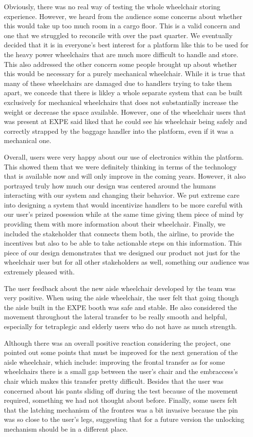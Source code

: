 	Obviously, there was no real way of testing the whole wheelchair storing experience. However, we heard from the audience some concerns about whether this would take up too much room in a cargo floor. This is a valid concern and one that we struggled to reconcile with over the past quarter. We eventually decided that it is in everyone's best interest for a platform like this to be used for the heavy power wheelchairs that are much more difficult to handle and store. This also addressed the other concern some people brought up about whether this would be necessary for a purely mechanical wheelchair. While it is true that many of these wheelchairs are damaged due to handlers trying to take them apart, we concede that there is likley a whole separate system that can be built exclusively for mechanical wheelchairs that does not substantially increase the weight or decrease the space available.  However, one of the wheelchair users that was present at EXPE said liked that he could see his wheelchair being safely and correctly strapped by the baggage handler into the platform, even if it was a mechanical  one. 


	Overall, users were very happy about our use of electronics within the platform. This showed them that we were definitely thinking in terms of the technology that is available now and will only improve in the coming years. However, it also portrayed truly how much our design was centered around the humans interacting with our system and changing their behavior. We put extreme care into designing a system that would incentivize handlers to be more careful with our user's prized posession while at the same time giving them piece of mind by providing them with more information about their wheelchair. Finally, we included the stakeholder that connects them both, the airline, to provide the incentives but also to be able to take actionable steps on this information. This piece of our design demonstrates that we designed our product not just for the wheelchair user but for all other stakeholders as well, something our audience was extremely pleased with. 


	The user feedback about the new aisle wheelchair developed by the team was very positive. When using the aisle wheelchair, the user felt that going though the aisle built in the EXPE booth was safe and stable. He also considered  the movement throughout the lateral transfer to be really smooth and helpful, especially for tetraplegic and elderly users who do not have as much strength. 

	Although there was an overall positive reaction considering the project, one pointed out some points that must be improved for the next generation of the aisle wheelchair, which include: improving the frontal transfer as for some wheelchairs there is a small gap  between the user’s chair and the embraccess’s chair which makes  this transfer pretty difficult. Besides that the user was concerned about  his pants sliding off during the test because of the movement required, something we had not thought about before. Finally, some users felt that the  latching mechanism of the frontres was a bit invasive because the pin  was so close to the user's legs,  suggesting that for a future version the unlocking mechanism should be in a different place.

